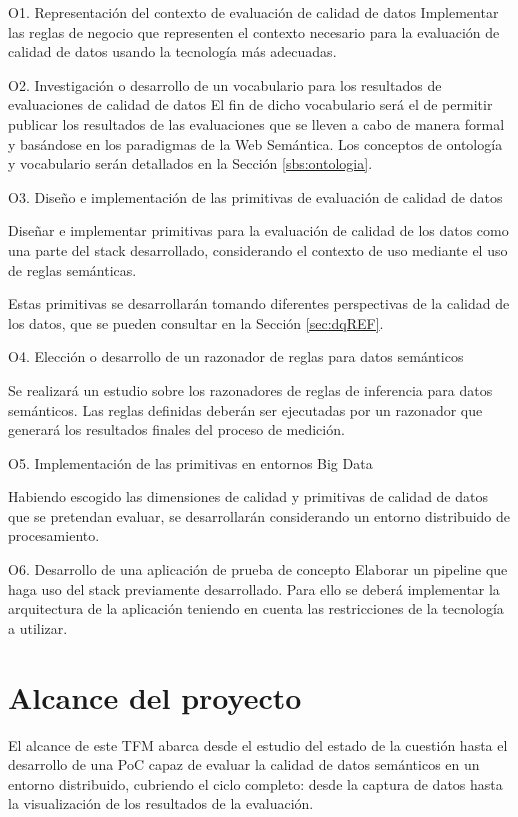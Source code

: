 \begin{definitionlist}
\item[O1. Representación del contexto de evaluación de calidad de datos]
Implementar  las  reglas  de  negocio  que representen el contexto necesario
para la evaluación de
calidad  de datos usando la tecnología más adecuadas.
\label{sec:reglas}

\item[O2. Investigación o desarrollo de un vocabulario para los resultados
  de evaluaciones de calidad de datos]
El fin de dicho vocabulario será el de permitir publicar los
resultados de las evaluaciones que se lleven a cabo de manera formal y basándose
en los paradigmas de la Web Semántica. Los conceptos de ontología y vocabulario
serán detallados en la Sección \ref{sbs:ontologia}. 

\item[O3. Diseño e implementación de las primitivas de evaluación de calidad de datos]

Diseñar e implementar primitivas para la evaluación de calidad de los datos como
una parte del stack desarrollado, considerando el contexto de uso mediante el uso
de reglas semánticas.

Estas primitivas se desarrollarán tomando diferentes perspectivas de la calidad
de los datos, que se pueden consultar en la Sección \ref{sec:dqREF}. 


\item[O4. Elección o desarrollo de un razonador de reglas para datos semánticos]

Se realizará un estudio sobre los razonadores de reglas de inferencia para
datos semánticos. Las reglas definidas deberán ser
ejecutadas por un razonador que generará los resultados finales del proceso de
medición. 

\item[O5. Implementación de las primitivas en entornos Big Data]

Habiendo escogido las dimensiones de calidad y primitivas de calidad de datos
que se pretendan evaluar, se desarrollarán considerando un entorno distribuido
de procesamiento. 

\item[O6. Desarrollo de una aplicación de prueba de concepto]
Elaborar un pipeline que haga uso del stack 
previamente desarrollado. Para ello se deberá implementar la arquitectura de
la aplicación teniendo en cuenta las restricciones de la tecnología a utilizar.

\end{definitionlist}


\section{Alcance del proyecto}

El alcance de este \acs{TFM} abarca desde el estudio del estado de la cuestión
hasta el desarrollo de una \acf{PoC} capaz de evaluar la calidad de datos
semánticos en un entorno distribuido, cubriendo el ciclo completo: desde la
captura de datos hasta la visualización de los resultados de la evaluación. 
